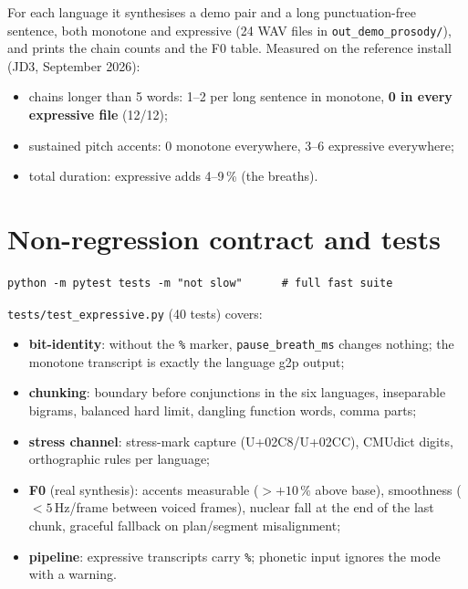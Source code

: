 \documentclass[11pt,a4paper]{article}
\newcommand{\ks}[1]{\texttt{#1}}
\begin{document}
For each language it synthesises a demo pair and a long
punctuation-free sentence, both monotone and expressive (24 WAV
files in \texttt{out\_demo\_prosody/}), and prints the chain
counts and the F0 table. Measured on the reference install
(JD3, September 2026):

\begin{itemize}[itemsep=1pt]
\item chains longer than 5 words: 1--2 per long sentence in
  monotone, \textbf{0 in every expressive file} (12/12);
\item sustained pitch accents: 0 monotone everywhere, 3--6
  expressive everywhere;
\item total duration: expressive adds 4--9\,\% (the breaths).
\end{itemize}

\section{Non-regression contract and tests}\label{sec:tests}

\begin{lstlisting}[style=shell]
python -m pytest tests -m "not slow"      # full fast suite
\end{lstlisting}

\texttt{tests/test\_expressive.py} (40 tests) covers:

\begin{itemize}[itemsep=1pt]
\item \textbf{bit-identity}: without the \ks{\%} marker,
  \texttt{pause\_breath\_ms} changes nothing; the monotone
  transcript is exactly the language g2p output;
\item \textbf{chunking}: boundary before conjunctions in the six
  languages, inseparable bigrams, balanced hard limit, dangling
  function words, comma parts;
\item \textbf{stress channel}: stress-mark capture (U+02C8/U+02CC),
  CMUdict digits, orthographic rules per language;
\item \textbf{F0} (real synthesis): accents measurable
  ($>+10\,\%$ above base), smoothness ($<5$\,Hz/frame between
  voiced frames), nuclear fall at the end of the last chunk,
  graceful fallback on plan/segment misalignment;
\item \textbf{pipeline}: expressive transcripts carry \ks{\%};
  phonetic input ignores the mode with a warning.
\end{itemize}
\end{document}
